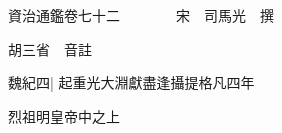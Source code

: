 






























































資治通鑑卷七十二　　　　宋　司馬光　撰

胡三省　音註

魏紀四|{
	起重光大淵獻盡逢攝提格凡四年}


烈祖明皇帝中之上

